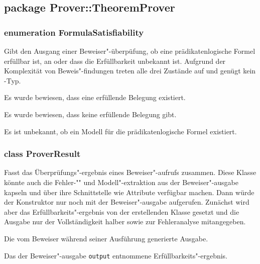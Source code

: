 \subsection{package Prover::TheoremProver}%

\subsubsection{enumeration FormulaSatisfiability}%

Gibt den Ausgang einer Beweiser"-überpüfung, ob eine
prädikatenlogische Formel erfüllbar ist, an oder dass die
Erfüllbarkeit unbekannt ist. Aufgrund der Komplexität von
Beweis"-findungen treten alle drei Zustände auf und genügt kein
\bool-Typ.%

\begin{description}%

    Es wurde bewiesen, dass eine erfüllende Belegung existiert.%


    Es wurde bewiesen, dass keine erfüllende Belegung gibt.%


    Es ist unbekannt, ob ein Modell für die prädikatenlogische Formel
    existiert.%

\end{description}%

\subsubsection{class ProverResult}%

Fasst das Überprüfungs"-ergebnis eines Beweiser"-aufrufs zusammen.
Diese Klasse könnte auch die Fehler-"" und Modell"-extraktion aus der
Beweiser"-ausgabe kapseln und über ihre Schnittstelle wie Attribute
verfügbar machen. Dann würde der Konstruktor nur noch mit der
Beweiser"-ausgabe aufgerufen. Zunächst wird aber das
Erfüllbarkeits"-ergebnis von der erstellenden Klasse gesetzt und die
Ausgabe nur der Vollständigkeit halber sowie zur Fehleranalyse
mitangegeben.%

\begin{description}%

    Die vom Beweiser während seiner Ausführung generierte Ausgabe.%


    Das der Beweiser"-ausgabe \texttt{output} entnommene
    Erfüllbarkeits"-ergebnis.%

\end{description}%

